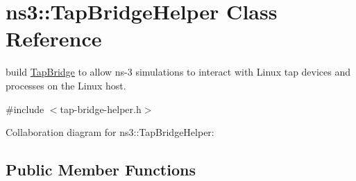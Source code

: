 \hypertarget{classns3_1_1TapBridgeHelper}{}\section{ns3\+:\+:Tap\+Bridge\+Helper Class Reference}
\label{classns3_1_1TapBridgeHelper}


build \hyperlink{classns3_1_1TapBridge}{Tap\+Bridge} to allow ns-\/3 simulations to interact with Linux tap devices and processes on the Linux host.  




{\ttfamily \#include $<$tap-\/bridge-\/helper.\+h$>$}



Collaboration diagram for ns3\+:\+:Tap\+Bridge\+Helper\+:
\subsection*{Public Member Functions}
